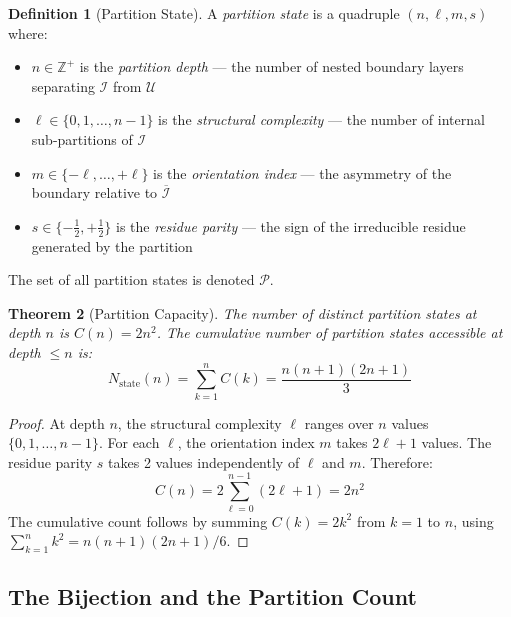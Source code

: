 \documentclass[11pt,twocolumn,a4paper]{article}
\theoremstyle{plain}
\newtheorem{theorem}{Theorem}[section]
\theoremstyle{definition}
\newtheorem{definition}[theorem]{Definition}
\theoremstyle{remark}
\begin{document}
\begin{definition}[Partition State]
\label{def:partition_state}
A \emph{partition state} is a quadruple $(n, \ell, m, s)$ where:
\begin{itemize}
    \item $n \in \mathbb{Z}^+$ is the \emph{partition depth} --- the number of
          nested boundary layers separating $\mathcal{I}$ from $\mathcal{U}$
    \item $\ell \in \{0, 1, \ldots, n-1\}$ is the \emph{structural complexity}
          --- the number of internal sub-partitions of $\mathcal{I}$
    \item $m \in \{-\ell, \ldots, +\ell\}$ is the \emph{orientation index}
          --- the asymmetry of the boundary relative to $\overline{\mathcal{I}}$
    \item $s \in \{-\frac{1}{2}, +\frac{1}{2}\}$ is the \emph{residue parity}
          --- the sign of the irreducible residue generated by the partition
\end{itemize}
The set of all partition states is denoted $\mathcal{P}$.
\end{definition}

\begin{theorem}[Partition Capacity]
\label{thm:capacity}
The number of distinct partition states at depth $n$ is $C(n) = 2n^2$. The
cumulative number of partition states accessible at depth $\leq n$ is:
\begin{equation}
    N_{\mathrm{state}}(n) = \sum_{k=1}^{n} C(k) = \frac{n(n+1)(2n+1)}{3}
    \label{eq:cumulative_states}
\end{equation}
\end{theorem}

\begin{proof}
At depth $n$, the structural complexity $\ell$ ranges over $n$ values
$\{0, 1, \ldots, n-1\}$. For each $\ell$, the orientation index $m$ takes
$2\ell + 1$ values. The residue parity $s$ takes 2 values independently of
$\ell$ and $m$. Therefore:
\begin{equation}
    C(n) = 2 \sum_{\ell=0}^{n-1}(2\ell + 1) = 2n^2
\end{equation}
The cumulative count follows by summing $C(k) = 2k^2$ from $k=1$ to $n$,
using $\sum_{k=1}^n k^2 = n(n+1)(2n+1)/6$.
\end{proof}

\subsection{The Bijection and the Partition Count}
\label{subsec:bijection}
\end{document}
